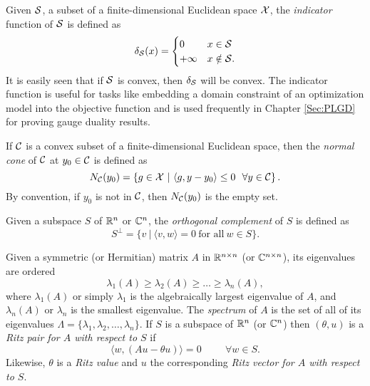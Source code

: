 Given ${\mathcal S}$, a subset of a finite-dimensional Euclidean space ${\mathcal X}$, the \textit{indicator} function of ${\mathcal S}$ is defined as
\begin{equation}  			\label{Def:indicator_function}
\delta_{\mathcal S}(x) =
	\begin{cases}
		0		&	x \in {\mathcal S}		\\
		+\infty		&	x \notin {\mathcal S}.
	\end{cases}
\end{equation}
It is easily seen that if ${\mathcal S}$ is convex, then $\delta_{\mathcal S}$ will be convex.  
The indicator function is useful for tasks like embedding a domain constraint of an optimization model into the objective function and is used frequently in Chapter \ref{Sec:PLGD} for proving gauge duality results.

If ${\mathcal C}$ is a convex subset of a finite-dimensional Euclidean space, then the \textit{normal cone} of ${\mathcal C}$ at $y_0 \in {\mathcal C}$ is defined as
\begin{equation} 			\label{Def:normal_cone}
N_{\mathcal C}(y_0) = \left\{ g \in {\mathcal X} \ | \ \langle g, y - y_0 \rangle \leq 0 \ \ \forall y \in {\mathcal C} \right\}.
\end{equation}
By convention, if $y_0$ is not in ${\mathcal C}$, then $N_{\mathcal C}(y_0)$ is the empty set.

Given a subspace $S$ of ${\mathbb R}^n$ or ${\mathbb C}^n$, the \textit{orthogonal complement} of $S$ is defined as
\begin{equation}
S^\perp = \{ v \ | \ \langle v, w \rangle = 0 \ \text{for all} \ w \in S \}.
\end{equation}


Given a symmetric (or Hermitian) matrix $A$ in ${\mathbb R}^{n \times n}$ (or ${\mathbb C}^{n \times n}$), its eigenvalues are ordered
\begin{equation}			\label{Def:eigenvalues}
\lambda_1(A) \geq \lambda_2(A) \geq \ldots \geq \lambda_n(A),
\end{equation}
where $\lambda_1(A)$ or simply $\lambda_1$ is the algebraically largest eigenvalue of $A$, and $\lambda_n(A)$ or $\lambda_n$ is the smallest eigenvalue.  The \textit{spectrum} of $A$ is the set of all of its eigenvalues $\Lambda = \{ \lambda_1, \lambda_2, \ldots, \lambda_n\}$.
If $S$ is a subspace of ${\mathbb R}^n$ (or ${\mathbb C}^n$) then $(\theta, u)$ is a \textit{Ritz pair for $A$ with respect to $S$} if 
\begin{equation} 			\label{Def:Ritz_pair_val_vec}
\langle w, (Au-\theta u) \rangle = 0 \hspace{1cm} \forall w \in S.
\end{equation}
Likewise, $\theta$ is a \textit{Ritz value} and $u$ the corresponding \textit{Ritz vector for $A$ with respect to $S$}.

